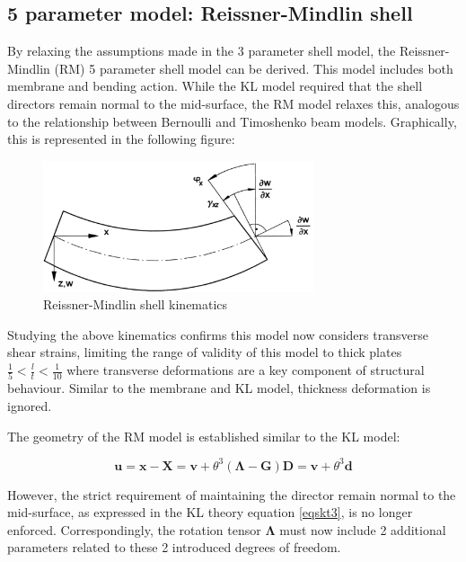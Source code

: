 \subsection{5 parameter model: Reissner-Mindlin shell}

By relaxing the assumptions made in the 3 parameter shell model, the Reissner-Mindlin (RM) 5 parameter shell model can be derived. This model includes both membrane and bending action. While the KL model required that the shell directors remain normal to the mid-surface, the RM model relaxes this, analogous to the relationship between Bernoulli and Timoshenko beam models. Graphically, this is represented in the following figure:

\begin{figure}[H]
	\centering
	\def\svgwidth{\columnwidth}
	\includegraphics[width=8cm]{images/timoshenkobeam.png}
	\caption{Reissner-Mindlin shell kinematics \cite{Bletz16}}
	\label{thickshellkine1}
\end{figure}

Studying the above kinematics confirms this model now considers transverse shear strains, limiting the range of validity of this model to thick plates $\frac{1}{5} < \frac{l}{t} < \frac{1}{10}$ where transverse deformations are a key component of structural behaviour. Similar to the membrane and KL model, thickness deformation is ignored. 

The geometry of the RM model is established similar to the KL model:

\begin{equation} 
\mathbf{u} = \mathbf{x} - \mathbf{X}
=
\mathbf{v} + \theta^3 (\boldsymbol{\Lambda} - \mathbf{G}) \mathbf{D}
=
\mathbf{v} + \theta^3 \mathbf{d}
\label{eqsrm1}
\end{equation}

However, the strict requirement of maintaining the director remain normal to the mid-surface, as expressed in the KL theory equation \eqref{eqskt3}, is no longer enforced. Correspondingly, the rotation tensor $\boldsymbol{\Lambda}$ must now include 2 additional parameters related to these 2 introduced degrees of freedom.

